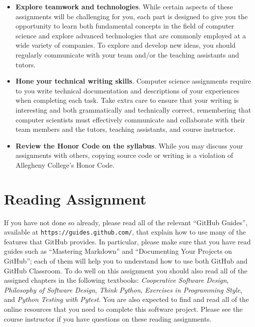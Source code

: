\documentclass[11pt]{article}
\newcommand{\cooperative}{{\em Cooperative Software Design\/}}
\newcommand{\philosophy}{{\em Philosophy of Software Design\/}}
\newcommand{\thinkpython}{{\em Think Python\/}}
\newcommand{\programmingstyle}{{\em Exercises in Programming Style\/}}
\newcommand{\pytest}{{\em Python Testing with Pytest\/}}
\newcommand{\url}[1]{\lstinline{#1}}
\begin{document}
\begin{itemize}
\item {\bf Explore teamwork and technologies}. While certain aspects of these
  assignments will be challenging for you, each part is designed to give you the
  opportunity to learn both fundamental concepts in the field of computer
  science and explore advanced technologies that are commonly employed at a wide
  variety of companies. To explore and develop new ideas, you should regularly
  communicate with your team and/or the teaching assistants and tutors.

\item {\bf Hone your technical writing skills}. Computer science assignments
  require to you write technical documentation and descriptions of your
  experiences when completing each task. Take extra care to ensure that your
  writing is interesting and both grammatically and technically correct,
  remembering that computer scientists must effectively communicate and
  collaborate with their team members and the tutors, teaching assistants, and
  course instructor.

\item {\bf Review the Honor Code on the syllabus}. While you may discuss your
  assignments with others, copying source code or writing is a violation of
  Allegheny College's Honor Code.

\end{itemize}

\section*{Reading Assignment}



If you have not done so already, please read all of the relevant ``GitHub
Guides'', available at \url{https://guides.github.com/}, that explain how to use
many of the features that GitHub provides. In particular, please make sure that
you have read guides such as ``Mastering Markdown'' and ``Documenting Your
Projects on GitHub''; each of them will help you to understand how to use both
GitHub and GitHub Classroom.
%
To do well on this assignment you should also read all of the assigned chapters
in the following textbooks: \cooperative, \philosophy, \thinkpython,
\programmingstyle, and \pytest.
%
You are also expected to find and read all of the online resources that you need
to complete this software project.
%
Please see the course instructor if you have questions on these reading
assignments.
\end{document}

